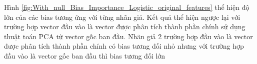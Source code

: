 \begin{enumerate}[label=(\alph*)]
    Hình \ref{fig:With_null_Bias_Importance_Logistic_original_features} thể hiện độ lớn của các bias tương ứng với từng nhãn giả.
    Kết quả thể hiện ngược lại với trường hợp vector đầu vào là vector được phân tích thành phần chính sử dụng thuật toán PCA từ vector gốc ban đầu.
    Nhãn giả 2 trường hợp đầu vào là vector được phân tích thành phần chính có bias tương đối nhỏ nhưng với trường hợp đầu vào là vector gốc ban đầu thì bias tương đối lớn

\end{enumerate}